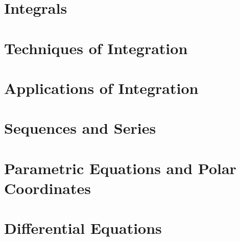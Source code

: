 \documentclass[12pt]{article}
\begin{document}
\section{Integrals}





\section{Techniques of Integration}





\section{Applications of Integration}




\section{Sequences and Series}






\section{Parametric Equations and Polar Coordinates}



\section{Differential Equations}



\end{document}
